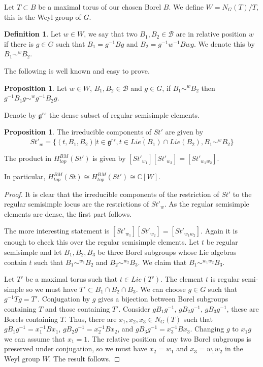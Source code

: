 \documentclass[12pt]{article}
\newcommand{\B}{\mathcal{B}}
\newcommand{\C}{\mathbb{C}}
\theoremstyle{plain}
\theoremstyle{definition}
\newtheorem{prop}[theorem]{Proposition}
\newtheorem{defn}[theorem]{Definition}
\begin{document}
 Let $T\subset B$ be a maximal torus of our chosen Borel $B$. We define $W=N_G(T)/T$, this is the Weyl group of $G$.

\begin{defn}
Let $w\in W$, we say that two $B_1,B_2\in \B$ are in relative position $w$ if there is $g\in G$ such that $B_1=g^{-1}Bg$ and $B_2=g^{-1}w^{-1}Bwg$. We denote this by $B_1\sim^wB_2$. 
\end{defn}

The following is well known and easy to prove.
\begin{prop}
    Let $w\in W$, $B_1,B_2\in \B$ and $g\in G$, if $B_1\sim^wB_2$ then $g^{-1}B_1g\sim^w g^{-1}B_2g$.
\end{prop}
  

Denote by $\mathfrak{g}^{rs}$ the dense subset of regular semisimple elements.

\begin{prop}
    

The irreducible components of $St'$ are given by $$St'_w=\overline{\{(t,B_1,B_2)|t\in \mathfrak{g}^{rs}, t\in Lie(B_1)\cap Lie(B_2), B_1\sim^wB_2\}}$$ 

The product in $H_{top}^{BM}(St')$ is given by $[St'_{w_1}][St'_{w_2}]=[St'_{w_1w_2}]$.

In particular,  $H_{top}^{BM}(St)\cong H_{top}^{BM}(St')\cong \C[W]$.

\end{prop}

\begin{proof}
    It is clear that the irreducible components of the restriction of $St'$ to the regular semisimple locus are the restrictions of $St'_w$. As the regular semisimple elements are dense, the first part follows.

    The more interesting statement is $[St'_{w_1}][St'_{w_2}]=[St'_{w_1w_2}]$. Again it is enough to check this over the regular semisimple elements. Let $t$ be regular semisimple and let $B_1,B_2,B_3$ be three Borel subgroups whose Lie algebras contain $t$ such that $B_1\sim^{w_1} B_2$ and $B_2\sim^{w_2} B_3$. We claim that $B_1\sim^{w_1w_2}B_3$. 

    Let $T'$ be a maximal torus such that $t\in Lie(T')$. The element $t$ is regular semi-simple so we must have $T'\subset B_1\cap B_2\cap B_3$. We can choose $g\in G$ such that $g^{-1}Tg=T'$. Conjugation by $g$ gives a bijection between Borel subgroups containing $T$ and those containing $T'$. Consider $gB_1g^{-1}$, $gB_2g^{-1}$, $gB_3g^{-1}$, these are Borels containing $T$. Thus, there are $x_1,x_2,x_3\in N_G(T)$ such that $gB_1g^{-1}=x^{-1}_1Bx_1$, $gB_2g^{-1}=x^{-1}_2Bx_2$, and  $gB_3g^{-1}=x^{-1}_3Bx_3$. Changing $g$ to $x_1g$ we can assume that $x_1=1$. The relative position of any two Borel subgroups is preserved under conjugation, so we must have $x_2=w_1$ and $x_3=w_1w_2$ in the Weyl group $W$. The result follows. 
\end{proof}
\end{document}
